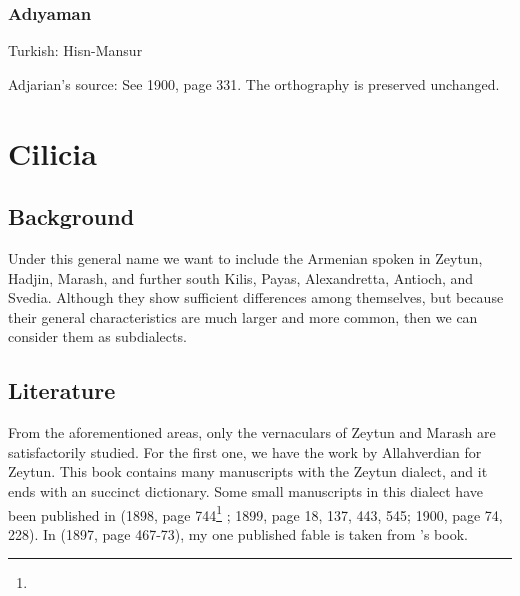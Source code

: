 



\begin{adjarianpage}\label{page:198}\end{adjarianpage}%






\subsection{Adıyaman}

Turkish: Hisn-Mansur

Adjarian's source: See  1900, page 331. The orthography is preserved unchanged. 




\chapter{Cilicia}\label{chapter:Cilicia}
\section{Background}
\begin{adjarianpage}\label{page:199}\end{adjarianpage}%

Under this general name we want to include the Armenian spoken in Zeytun, Hadjin, Marash, and further south Kilis, Payas, Alexandretta, Antioch, and Svedia. Although they show sufficient differences among themselves, but because their general characteristics are much larger and more common, then we can consider them as subdialects. 

\section{Literature}
From the aforementioned areas, only the vernaculars of Zeytun and Marash are satisfactorily studied. For the first one, we have the work by Allahverdian \citep{Allahverdian-1884-UlniaZeytun} for Zeytun. This book contains many manuscripts with the Zeytun dialect, and it ends with an succinct dictionary. Some small manuscripts in this dialect have been published in  (1898, page 744\footnote{} ; 1899, page 18, 137, 443, 545; 1900, page 74, 228). In  (1897, page 467-73), my one published fable is taken from \citeauthor{Allahverdian-1884-UlniaZeytun}'s book.


